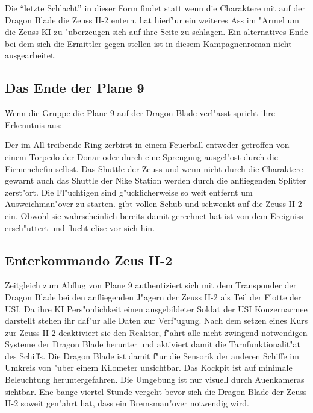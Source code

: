 
Die "`letzte Schlacht"' in dieser Form findet statt wenn die Charaktere mit \xl{} auf der Dragon Blade die Zeuss II-2 entern. \xl{} hat hierf"ur ein weiteres Ass im "Armel um die Zeuss KI zu "uberzeugen sich auf ihre Seite zu schlagen. Ein alternatives Ende bei dem sich die Ermittler gegen \xl{} stellen ist in diesem Kampagnenroman nicht ausgearbeitet.

\subsection{Das Ende der Plane 9}
Wenn die Gruppe die Plane 9 auf der Dragon Blade verl"asst spricht \xl{} ihre Erkenntnis aus:


Der im All treibende Ring zerbirst in einem Feuerball entweder getroffen von einem Torpedo der Donar oder durch eine Sprengung ausgel"ost durch die Firmenchefin selbst. Das Shuttle der Zeuss und wenn nicht durch die Charaktere gewarnt auch das Shuttle der Nike Station werden durch die anfliegenden Splitter zerst"ort. Die Fl"uchtigen sind g"ucklicherweise so weit entfernt um Ausweichman"over zu starten. \xl{} gibt vollen Schub und schwenkt auf die Zeuss II-2 ein. Obwohl sie wahrscheinlich bereits damit gerechnet hat ist \ml{} von dem Ereigniss ersch"uttert und flucht elise vor sich hin.

\subsection{Enterkommando Zeus II-2}
Zeitgleich zum Abflug von Plane 9 authentiziert sich \xl{} mit dem Transponder der Dragon Blade bei den anfliegenden J"agern der Zeuss II-2 als Teil der Flotte der USI. Da ihre KI Pers"onlichkeit einen ausgebildeter Soldat der USI Konzernarmee darstellt stehen ihr daf"ur alle Daten zur Verf"ugung. Nach dem setzen eines Kurs zur Zeuss II-2 deaktiviert sie den Reaktor, f"ahrt alle nicht zwingend notwendigen Systeme der Dragon Blade herunter und aktiviert damit die Tarnfunktionalit"at des Schiffs. Die Dragon Blade ist damit f"ur die Sensorik der anderen Schiffe im Umkreis von "uber einem Kilometer unsichtbar. Das Kockpit ist auf minimale Beleuchtung heruntergefahren. Die Umgebung ist nur visuell durch Au\3enkameras sichtbar. Ene bange viertel Stunde vergeht bevor sich die Dragon Blade der Zeuss II-2 soweit gen"ahrt hat, dass ein Bremsman"over notwendig wird.

